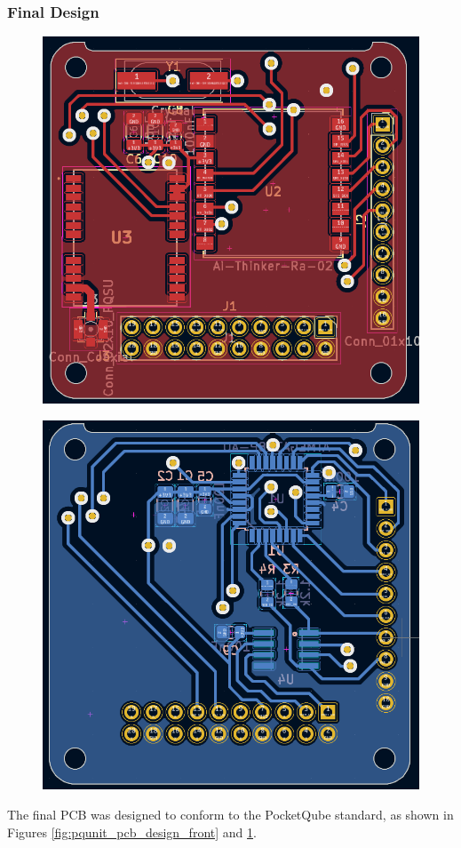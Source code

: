 \subsubsection{Final Design}
\begin{figure}[!htb]
  \centering
  \begin{minipage}{.43\textwidth}
    \centering
    \includegraphics[width=.9\linewidth]{pqunit_pcb_design_front}
    \label{fig:pqunit_pcb_design_front}
  \end{minipage}
  \begin{minipage}{.43\textwidth}
    \centering
    \includegraphics[width=.9\linewidth]{pqunit_pcb_design_back}
    \label{fig:pqunit_pcb_design_back}
  \end{minipage}
  \end{figure}

The final PCB was designed to conform to the PocketQube standard, as shown in Figures \ref{fig:pqunit_pcb_design_front} and \ref{fig:pqunit_pcb_design_back}.